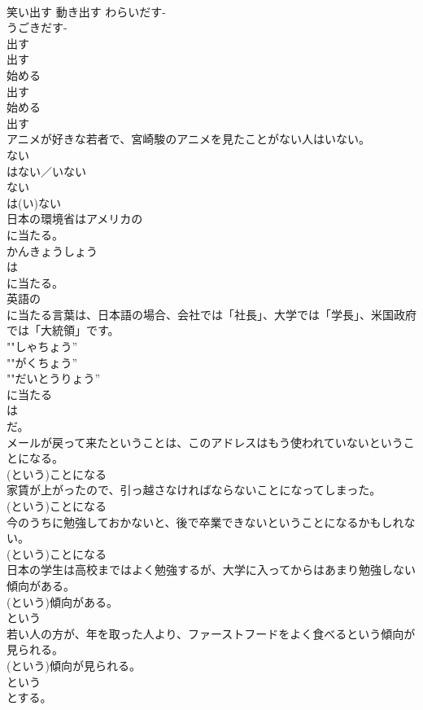 \documentclass[8pt]{extreport}
\begin{document}
\begin{CJK}{UTF8}{min}
{\\	笑い出す 動き出す	わらいだす-
\\	うごきだす- 
\\	出す 
\\	出す 
\\	始める 
\\	出す 
\\	始める 
\\	出す 
\\	アニメが好きな若者で、宮崎駿のアニメを見たことがない人はいない。	
\\	ない 
\\	は{ない／いない} 
\\	ない
\\	は(い)ない 
\\	日本の環境省はアメリカの 
\\	に当たる。	
\\	かんきょうしょう 
\\	は
\\	に当たる。 
\\	英語の
\\	に当たる言葉は、日本語の場合、会社では「社長」、大学では「学長」、米国政府では「大統領」です。	
\\	""しゃちょう” 
\\	""がくちょう” 
\\	""だいとうりょう” 
\\	に当たる
\\	は
\\	だ。 
\\	メールが戻って来たということは、このアドレスはもう使われていないということになる。	
\\	(という)ことになる 
\\	家賃が上がったので、引っ越さなければならないことになってしまった。	
\\	(という)ことになる 
\\	今のうちに勉強しておかないと、後で卒業できないということになるかもしれない。	
\\	(という)ことになる 
\\	日本の学生は高校まではよく勉強するが、大学に入ってからはあまり勉強しない傾向がある。	
\\	(という)傾向がある。 
\\	という 
\\	若い人の方が、年を取った人より、ファーストフードをよく食べるという傾向が見られる。	
\\	(という)傾向が見られる。 
\\	という 
\\	とする。	
}
\end{CJK}
\end{document}
